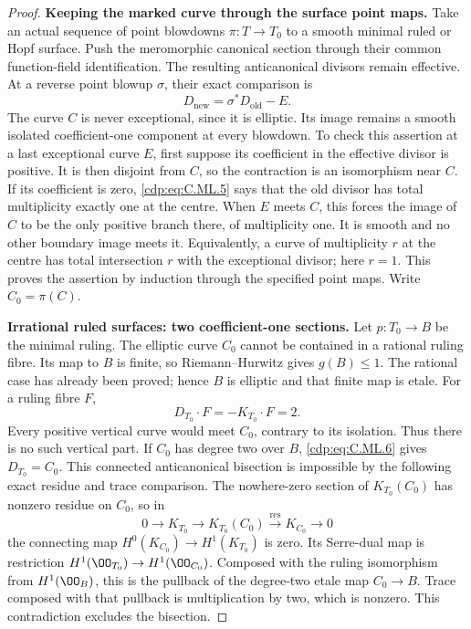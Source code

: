 \begin{proof}
\par\medskip\noindent\textbf{Keeping the marked curve through the surface point maps.}
Take an actual sequence of point blowdowns
\(\pi:T\to T_0\) to a smooth minimal ruled or Hopf
surface. Push the meromorphic canonical section
through their common function-field identification.
The resulting anticanonical divisors remain effective.
At a reverse point blowup \(\sigma\), their exact
comparison is
\[
                 D_{\mathrm{new}}=\sigma^*D_{\mathrm{old}}-E.
\tag{C.ML.5}\label{cdp:eq:C.ML.5}
\]
The curve \(C\) is never exceptional, since it is
elliptic. Its image remains a smooth isolated
coefficient-one component at every blowdown. To
check this assertion at a last exceptional curve
\(E\), first suppose its coefficient in the
effective divisor is positive. It is then disjoint
from \(C\), so the contraction is an isomorphism
near \(C\). If its coefficient is zero, \eqref{cdp:eq:C.ML.5}
says that the old divisor has total multiplicity
exactly one at the centre. When \(E\) meets \(C\),
this forces the image of \(C\) to be the only
positive branch there, of multiplicity one. It is
smooth and no other boundary image meets it.
Equivalently, a curve of multiplicity \(r\) at
the centre has total intersection \(r\) with
the exceptional divisor; here \(r=1\).
This proves the assertion by induction through
the specified point maps. Write \(C_0=\pi(C)\).

\par\medskip\noindent\textbf{Irrational ruled surfaces: two coefficient-one sections.}
Let \(p:T_0\to B\) be the minimal ruling. The
elliptic curve \(C_0\) cannot be contained in a
rational ruling fibre. Its map to \(B\) is finite,
so Riemann--Hurwitz gives \(g(B)\le1\).
The rational case has already been proved; hence
\(B\) is elliptic and that finite map is etale.
For a ruling fibre \(F\),
\[
                 D_{T_0}\cdot F=-K_{T_0}\cdot F=2.
\tag{C.ML.6}\label{cdp:eq:C.ML.6}
\]
Every positive vertical curve would meet \(C_0\),
contrary to its isolation. Thus there is no such
vertical part. If \(C_0\) has degree two over
\(B\), \eqref{cdp:eq:C.ML.6} gives \(D_{T_0}=C_0\).
This connected anticanonical bisection is impossible
by the following exact residue and trace comparison.
The nowhere-zero section of \(K_{T_0}(C_0)\)
has nonzero residue on \(C_0\), so in
\[
 0\longrightarrow K_{T_0}\longrightarrow K_{T_0}(C_0)
       \xrightarrow{\operatorname{res}}K_{C_0}\longrightarrow0
\tag{C.ML.7}\label{cdp:eq:C.ML.7}
\]
the connecting map \(H^0(K_{C_0})\to H^1(K_{T_0})\)
is zero. Its Serre-dual map is restriction
\(H^1(\OO_{T_0})\to H^1(\OO_{C_0})\).
Composed with the ruling isomorphism from
\(H^1(\OO_B)\), this is the pullback of the
degree-two etale map \(C_0\to B\). Trace composed
with that pullback is multiplication by two,
which is nonzero. This contradiction excludes
the bisection.


\end{proof}

